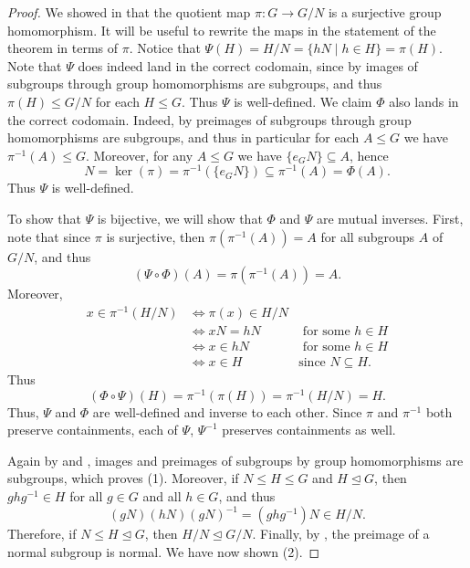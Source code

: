 \documentclass[12pt]{report}
\numberwithin{equation}{section}
\numberwithin{theorem}{chapter}
\theoremstyle{definition}
\newtheorem*{basic properties}{Basic Properties}
\newtheorem*{Important Remark}{Important Remark}
\renewcommand{\ker}{\operatorname{ker}}
\begin{document}
\begin{proof} 
We showed in  that the quotient map $\pi\!:G\to G/N$ is a surjective group homomorphism. It will be useful to rewrite the maps in the statement of the theorem in terms of $\pi$.
Notice that $\Psi(H)=H/N=\{hN \mid h\in H\}=\pi(H)$.
Note that $\Psi$ does indeed land in the correct codomain, since by  images of subgroups through group homomorphisms are subgroups, and thus $\pi(H)\leq G/N$ for each $H \leq G$. Thus $\Psi$ is well-defined.
We claim $\Phi$ also lands in the correct codomain. Indeed, by  preimages of subgroups through group homomorphisms are subgroups, and thus in particular for each $A \leq G$ we have $\pi^{-1}(A)\leq G$. Moreover, for any $A \leq G$ we have
$\{e_GN\} \subseteq A$, hence 
$$N = \ker(\pi) = \pi^{-1}(\{e_GN\}) \subseteq \pi^{-1}(A) = \Phi(A).$$
Thus $\Psi$ is well-defined.

To show that $\Psi$ is bijective, we will show that $\Phi$ and $\Psi$ are mutual inverses. First, note that since $\pi$ is surjective, then $\pi(\pi^{-1}(A))=A$ for all subgroups $A$ of $G/N$, and thus
$$(\Psi\circ\Phi)(A)=\pi(\pi^{-1}(A))=A.$$
Moreover, 
\begin{align*}
    x\in \pi^{-1}(H/N) &\iff \pi(x)\in H/N \\
    & \iff xN=hN & \text{ for some } h\in H \\
    & \iff x\in hN & \text{ for some } h\in H \\
    & \iff x\in H & \text{since } N\subseteq H.
    \end{align*}
Thus
$$(\Phi\circ\Psi)(H)=\pi^{-1}(\pi(H))=\pi^{-1}(H/N)=H.$$
Thus, $\Psi$ and $\Phi$ are well-defined and inverse to each other. Since $\pi$ and $\pi^{-1}$ both preserve containments, each of $\Psi$, $\Psi^{-1}$ preserves containments as well.



Again by  and , images and preimages of subgroups by group homomorphisms are subgroups, which proves (1). Moreover, if $N \leq H \leq G$ and $H \trianglelefteq G$, then $ghg^{-1} \in H$ for all $g \in G$ and all $h \in G$, and thus
$$(gN)(hN)(gN)^{-1}= (ghg^{-1})N \in H/N.$$
Therefore, if $N \leq H \trianglelefteq G$, then $H/N \trianglelefteq G/N$. Finally, by , the preimage of a normal subgroup is normal. We have now shown (2).


\end{proof}
\end{document}
